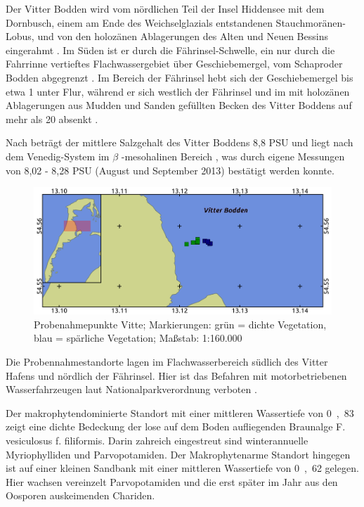 Der Vitter Bodden wird vom nördlichen Teil der Insel Hiddensee mit dem Dornbusch, einem am Ende des Weichselglazials entstandenen Stauchmoränen-Lobus, und von den holozänen Ablagerungen des Alten und Neuen Bessins eingerahmt \citep{katzung_2004}.
Im Süden ist er durch die Fährinsel-Schwelle, ein nur durch die Fahrrinne vertieftes Flachwassergebiet über Geschiebemergel, vom Schaproder Bodden abgegrenzt \citep{mobus_2001}. Im Bereich der Fährinsel hebt sich der Geschiebemergel bis etwa \unit{1}{\metre} unter Flur, während er sich westlich der Fährinsel und im mit holozänen Ablagerungen aus Mudden und Sanden gefüllten Becken des Vitter Boddens auf mehr als \unit{20}{\metre} absenkt \citep{mobus_2001}.

Nach \cite{bachor_2005} beträgt der mittlere Salzgehalt des Vitter Boddens 8,8 PSU und liegt nach dem Venedig-System im $\beta$ -mesohalinen Bereich \citep{gosselck_2011}, was durch eigene Messungen von 8,02 - 8,28 PSU (August und September 2013) bestätigt werden konnte. 

\begin{figure}[htb]
\centering
\includegraphics[width=1\textwidth]{images/Vitte.png}
\caption[Probenahmepunkte Vitte]{Probenahmepunkte Vitte; Markierungen: grün = dichte Vegetation, blau = spärliche Vegetation; Maßstab: 1:160.000}
\label{Vitte}
\end{figure}


Die Probennahmestandorte lagen im Flachwasserbereich südlich des Vitter Hafens und nördlich der Fährinsel. Hier ist das Befahren mit motorbetriebenen Wasserfahrzeugen laut Nationalparkverordnung verboten \citep{landesamt_fur_forsten_2002}.

Der makrophytendominierte Standort mit einer mittleren Wassertiefe von \unit{0,83}{\metre} zeigt eine dichte Bedeckung der lose auf dem Boden aufliegenden Braunalge F. vesiculosus f. filiformis. Darin zahreich eingestreut sind winterannuelle Myriophylliden und Parvopotamiden. Der Makrophytenarme Standort hingegen ist auf einer kleinen Sandbank mit einer mittleren Wassertiefe von \unit{0,62}{\metre} gelegen. Hier wachsen vereinzelt Parvopotamiden und die erst später im Jahr aus den Oosporen auskeimenden Chariden. 


